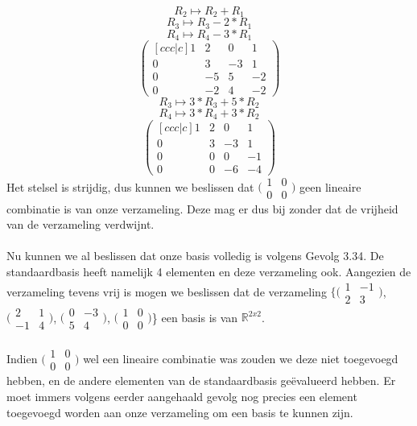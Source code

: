 \documentclass[lineaire_algebra_oplossingen.tex]{subfiles}
\begin{document}
\[R_2 \mapsto R_2 + R_1 \]
\[R_3 \mapsto R_3 - 2*R_1 \]
\[R_4 \mapsto R_4 - 3*R_1 \]
\[
\begin{pmatrix}[ccc|c]
1 & 2 & 0 & 1\\
0 & 3 & -3 & 1\\
0 & -5 & 5 & -2\\
0 & -2 & 4 & -2
\end{pmatrix}
\]
\[R_3 \mapsto 3*R_3 + 5*R_2 \]
\[R_4 \mapsto 3*R_4 + 3*R_2 \]
\[
\begin{pmatrix}[ccc|c]
1 & 2 & 0 & 1\\
0 & 3 & -3 & 1\\
0 & 0 & 0 & -1\\
0 & 0 & -6 & -4
\end{pmatrix}
\]
Het stelsel is strijdig, dus kunnen we beslissen dat $\bigl(
\begin{smallmatrix}
1&0\\ 0&0
\end{smallmatrix}
\bigr)$ geen lineaire combinatie is van onze verzameling. Deze mag er dus bij zonder dat de vrijheid van de verzameling verdwijnt.\\\\
Nu kunnen we al beslissen dat onze basis volledig is volgens Gevolg 3.34. De standaardbasis heeft namelijk 4 elementen en deze verzameling ook. Aangezien de verzameling tevens vrij is mogen we beslissen dat de verzameling $\{\bigl(
\begin{smallmatrix}
1&-1\\ 2&3
\end{smallmatrix}
\bigr)$,
$\bigl(
\begin{smallmatrix}
2&1\\ -1&4
\end{smallmatrix}
\bigr)$,
$\bigl(
\begin{smallmatrix}
0&-3\\ 5&4
\end{smallmatrix}
\bigr)$,
$\bigl(
\begin{smallmatrix}
1&0\\ 0&0
\end{smallmatrix}
\bigr)$\} een basis is van $\mathbb{R}^{2x2}$.\\\\
Indien $\bigl(
\begin{smallmatrix}
1&0\\ 0&0
\end{smallmatrix}
\bigr)$ wel een lineaire combinatie was zouden we deze niet toegevoegd hebben, en de andere elementen van de standaardbasis ge\"evalueerd hebben. Er moet immers volgens eerder aangehaald gevolg nog precies een element toegevoegd worden aan onze verzameling om een basis te kunnen zijn.
\end{document}
